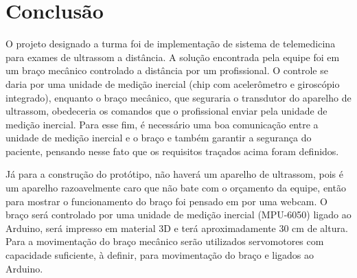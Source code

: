 \chapter{Conclusão}
O projeto designado a turma foi de implementação de sistema de telemedicina para exames de ultrassom a distância. A solução encontrada pela equipe foi em um braço mecânico controlado a distância por um profissional. O controle se daria por uma unidade de medição inercial (chip com acelerômetro e giroscópio integrado), enquanto o braço mecânico, que seguraria o transdutor do aparelho de ultrassom, obedeceria os comandos que o profissional enviar pela unidade de medição inercial. Para esse fim, é necessário uma boa comunicação entre a unidade de medição inercial e o braço e também garantir a segurança do paciente, pensando nesse fato que os requisitos traçados acima foram definidos.

	Já para a construção do protótipo, não haverá um aparelho de ultrassom, pois é um aparelho razoavelmente caro que não bate com o orçamento da equipe, então para mostrar o funcionamento do braço foi pensado em por uma webcam. O braço será controlado por uma unidade de medição inercial (MPU-6050) ligado ao Arduino, será impresso em material 3D e terá aproximadamente 30 cm de altura. Para a movimentação do braço mecânico serão utilizados servomotores com capacidade suficiente, à definir, para movimentação do braço e ligados ao Arduino.
	
\nocite{inmetro2003}
\nocite{abesco1}
\nocite{aneel1}
\nocite{santos1}
\nocite{portalsol1}
\nocite{ultrasom1}
\nocite{bracomec}
\nocite{ultrasom2}
\nocite{mathiassen-frontiers2016}
\nocite{pierrot1999hippocrate}
\nocite{djangoframe}
\nocite{moreto2007controle}
\nocite{fanuc}
\nocite{maquinasele}